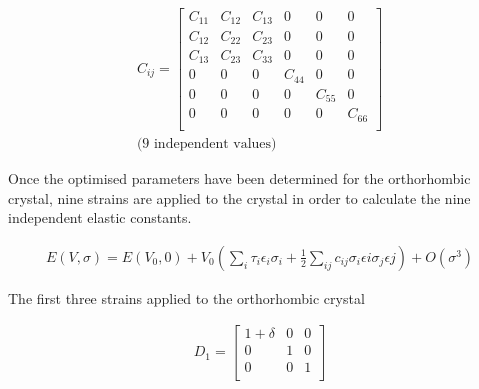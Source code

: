 \documentclass[12pt,twoside]{manual}
\begin{document}
\begin{equation}
    \begin{split}
      C_{ij} = 
      \begin{bmatrix}
      C_{11} & C_{12} & C_{13} & 0      & 0      & 0      \\
      C_{12} & C_{22} & C_{23} & 0      & 0      & 0      \\
      C_{13} & C_{23} & C_{33} & 0      & 0      & 0      \\
      0      & 0      & 0      & C_{44} & 0      & 0      \\
      0      & 0      & 0      & 0      & C_{55} & 0      \\
      0      & 0      & 0      & 0      & 0      & C_{66} \\
      \end{bmatrix}\\
      \text{(9 independent values)}
    \end{split}
    \label{eq:eqOrthoRhombicEC}
\end{equation}







Once the optimised parameters have been determined for the orthorhombic crystal, nine strains are applied to the crystal \cite{DftTiSiRavindran} in order to calculate the nine independent elastic constants.

  \begin{equation}
    \begin{split}
    E(V,\sigma) = E(V_{0},0) + V_{0} \left( \sum_{i} \tau_i \epsilon_i \sigma_i + \frac{1}{2} \sum_{ij} c_{ij} \sigma_{i} \epsilon{i} \sigma_{j} \epsilon{j} \right) + O(\sigma^3)
    \end{split}
  \end{equation}

The first three strains applied to the orthorhombic crystal 

\begin{equation}
    \begin{split}
      D_{1} = 
      \begin{bmatrix}
      1 + \delta & 0       & 0             \\
      0          & 1       & 0             \\
      0          & 0       & 1             \\
      \end{bmatrix}
    \end{split}
\end{equation}
\end{document}
